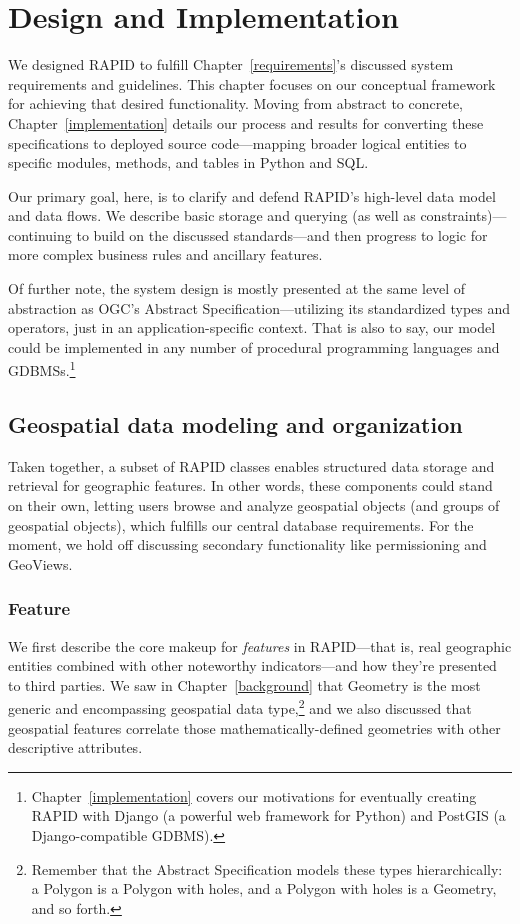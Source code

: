 \chapter{Design and Implementation}
\label{design}


We designed RAPID to fulfill Chapter~\ref{requirements}'s discussed system requirements and guidelines. This chapter focuses on our conceptual framework for achieving that desired functionality. Moving from abstract to concrete, Chapter~\ref{implementation} details our process and results for converting these specifications to deployed source code---mapping broader logical entities to specific modules, methods, and tables in Python and SQL.

Our primary goal, here, is to clarify and defend RAPID's high-level data model and data flows. We describe basic storage and querying (as well as constraints)---continuing to build on the discussed standards---and then progress to logic for more complex business rules and ancillary features.

Of further note, the system design is mostly presented at the same level of abstraction as OGC's Abstract Specification---utilizing its standardized types and operators, just in an application-specific context. That is also to say, our model could be implemented in any number of procedural programming languages and GDBMSs.\footnote{Chapter~\ref{implementation} covers our motivations for eventually creating RAPID with Django (a powerful web framework for Python) and PostGIS (a Django-compatible GDBMS).}

\section{Geospatial data modeling and organization}
Taken together, a subset of RAPID classes enables structured data storage and retrieval for geographic features. In other words, these components could stand on their own, letting users browse and analyze geospatial objects (and groups of geospatial objects), which fulfills our central database requirements. For the moment, we hold off discussing secondary functionality like permissioning and GeoViews.

\subsection{Feature}
We first describe the core makeup for \textit{features} in RAPID---that is, real geographic entities combined with other noteworthy indicators---and how they're presented to third parties. We saw in Chapter~\ref{background} that Geometry is the most generic and encompassing geospatial data type,\footnote{Remember that the Abstract Specification models these types hierarchically: a Polygon is a Polygon with holes, and a Polygon with holes is a Geometry, and so forth.} and we also discussed that geospatial features correlate those mathematically-defined geometries with other descriptive attributes.

